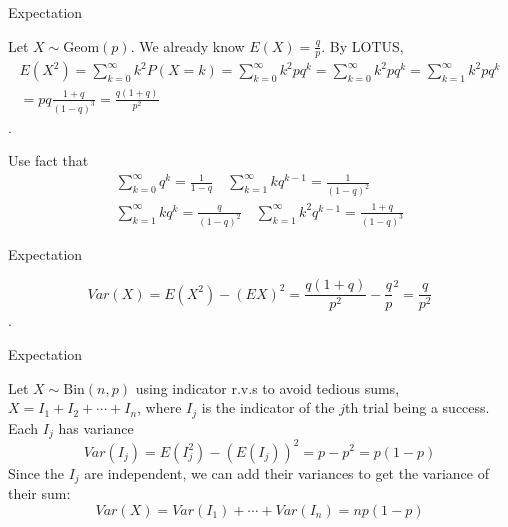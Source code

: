 \documentclass[8pt]{beamer}
\begin{document}
\begin{frame}{Expectation}
    \begin{example}
        Let $X \sim \text{Geom}(p)$. We already know $E(X)=\frac{q}{p}$. By LOTUS,
        \[
        \begin{gathered}
            E(X^2) = \sum^\infty_{k=0} k^2 P(X=k)=\sum^\infty_{k=0} k^2 p q^k = \sum^\infty_{k=0} k^2 p q^k = \sum^{\infty}_{k=1} k^2 p q^k \\
            = pq \frac{1+q}{(1-q)^3} = \frac{q(1+q)}{p^2}
        \end{gathered}
        \].
    \end{example}
    Use fact that 
    \[
        \begin{gathered}
            \sum^\infty_{k=0} q^k = \frac{1}{1-q}\quad
            \sum^\infty_{k=1}kq^{k-1} = \frac{1}{(1-q)^2}\\
            \sum^\infty_{k=1}kq^k = \frac{q}{(1-q)^2}\quad
            \sum^\infty_{k=1}k^2 q^{k-1} = \frac{1+q}{(1-q)^3}
        \end{gathered}
    \]
\end{frame}

\begin{frame}{Expectation}
    \begin{example}
        \[
        Var(X) = E(X^2) - (EX)^2 = \frac{q(1+q)}{p^2} - \frac{q}{p}^2 = \frac{q}{p^2}
        \].
    \end{example}
\end{frame}



\begin{frame}{Expectation}
    \begin{example}
        Let $X \sim \text{Bin}(n,p)$ using indicator r.v.s to avoid tedious sums, $X=I_1+I_2+\cdots+I_n$, where $I_j$ is the indicator of the $j$th trial being a success. Each $I_j$ has variance
        \[
        Var(I_j) = E(I_j^2) - (E(I_j))^2 = p - p^2 = p(1-p)
        \]
        Since the $I_j$ are independent, we can add their variances to get the variance of their sum:
        \[
        Var(X) = Var(I_1) + \cdots + Var(I_n) = np(1-p)
        \]
    \end{example}
\end{frame}
\end{document}
